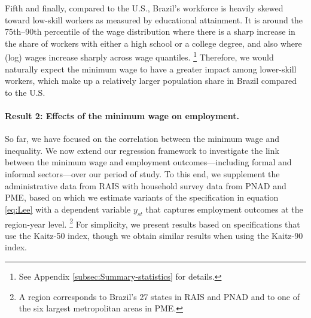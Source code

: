 %
Fifth and finally, compared to the U.S., Brazil's workforce is heavily skewed toward low-skill workers as measured by educational attainment. It is around the 75th--90th percentile of the wage distribution where there is a sharp increase in the share of workers with either a high school or a college degree, and also where (log) wages increase sharply across wage quantiles.%
%
\footnote{See Appendix \ref{subsec:Summary-statistics} for details.} %
%
Therefore, we would naturally expect the minimum wage to have a greater impact among lower-skill workers, which make up a relatively larger population share in Brazil compared to the U.S.


\paragraph{Result 2: Effects of the minimum wage on employment.}

So far, we have focused on the correlation between the minimum wage and inequality. We now extend our regression framework to investigate the link between the minimum wage and employment outcomes---including formal and informal sectors---over our period of study. To this end, we supplement the administrative data from RAIS with household survey data from PNAD and PME, based on which we estimate variants of the specification in equation \eqref{eq:Lee} with a dependent variable $y_{st}$ that captures employment outcomes at the region-year level.
%
\footnote{A region corresponds to Brazil's 27 states in RAIS and PNAD and to one of the six largest metropolitan areas in PME.} %
%
For simplicity, we present results based on specifications that use the Kaitz-50 index, though we obtain similar results when using the Kaitz-90 index.

